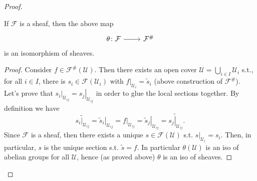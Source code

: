 \documentclass[../Main]{subfiles}
\begin{document}
\begin{proof}
\begin{lem}
	If $\mathcal{F}$ is a sheaf, then the above map 
	\begin{equation}
		\begin{tikzcd}
			\theta\colon \mathcal{F} \arrow[r, "", rightarrow] &
	\mathcal{F}^\#
		\end{tikzcd}
	\end{equation} 
	is an isomorphism of sheaves.
\end{lem} 	
\begin{proof}
	Consider $f \in \mathcal{F}^\#(\mathcal{U})$.
	Then there exists an open cover $\mathcal{U} = \bigcup_{i \in I} \mathcal{U}_i$ s.t.,
	for all $i \in I$, there is $s_i \in \mathcal{F}(\mathcal{U}_i)$
	with $\left.f\right|_{\mathcal{U}_i} = \tilde{s}_i$
	(above construction of $\mathcal{F}^\#$).
	Let's prove that $\left.s_i\right|_{\mathcal{U}_{ij}} = \left.s_j\right|_{\mathcal{U}_{ij}}$
	in order to glue the local sections together.
	By definition we have
	\begin{equation}
	\widetilde{\left.s_i\right|_{\mathcal{U}_{ij}}} =
	\left.\tilde{s}_i\right|_{\mathcal{U}_{ij}} =
	\left.f\right|_{\mathcal{U}_{ij}} =
	\left.\tilde{s}_j\right|_{\mathcal{U}_{ij}} =
	\widetilde{\left.s_j\right|_{\mathcal{U}_{ij}}}
	.\end{equation} 
	Since $\mathcal{F}$ is a sheaf, then there exists a unique $s \in \mathcal{F}(\mathcal{U})$
	s.t. $\left.s\right|_{\mathcal{U}_i} = s_i$.
	Then, in particular, $s$ is the unique section s.t. $\tilde{s} = f$.
	In particular $\theta(\mathcal{U})$ is an iso of abelian groups for all $\mathcal{U}$,
	hence (as proved above) $\theta$ is an iso of sheaves.
\end{proof}


\end{proof}
\end{document}
